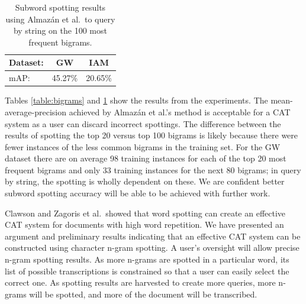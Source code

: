 \documentclass[conference]{IEEEtran}
\begin{document}
\begin{table}
\caption{Subword spotting results using Almaz\'{a}n et al.~to query by string on the 100 most frequent bigrams.}
\begin{center}
\label{table:res100}
\begin{tabular}{@{}lcc@{}}

Dataset: & GW      & IAM\\ \midrule
mAP:     & 45.27\% & 20.65\%
\end{tabular}
\end{center}
\end{table}


Tables \ref{table:bigrams} and \ref{table:res100} show the results from the experiments. The mean-average-precision achieved by Almaz\'{a}n et al.'s method is acceptable for a CAT system as a user can discard incorrect spottings. The difference between the results of spotting the top 20 versus top 100 bigrams is likely because there were fewer instances of the less common bigrams in the training set. For the GW dataset there are on average 98 training instances for each of the top 20 most frequent bigrams and only 33 training instances for the next 80 bigrams; in query by string, the spotting is wholly dependent on these.
We are confident better subword spotting accuracy will be able to be achieved with further work.

Clawson and Zagoris et al.~showed that word spotting can create an effective CAT system for documents with high word repetition. We have presented an argument and preliminary results indicating that an effective CAT system can be constructed using character n-gram spotting. A user's oversight will allow precise n-gram spotting results. As more n-grams are spotted in a particular word, its list of possible transcriptions is constrained so that a user can easily select the correct one. As spotting results are harvested to create more queries, more n-grams will be spotted, and more of the document will be transcribed.





\end{document}
